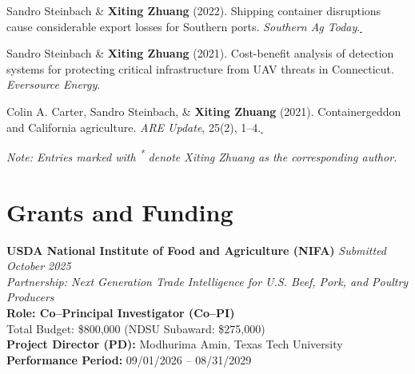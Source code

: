 \documentclass[10.5pt,letterpaper]{article}
\newcommand{\paperlink}[1]{\href{#1}{\,\small\faExternalLink}}
\renewenvironment{itemize}{
	\begin{list}{}{
			\setlength{\leftmargin}{1.5em}
		}
	}{
	\end{list}
}
\begin{document}
\begin{itemize}
		\item[-] Sandro Steinbach \& \textbf{Xiting Zhuang} (2022). Shipping container disruptions cause considerable export losses for Southern ports. \textit{Southern Ag Today}.\paperlink{https://southernagtoday.org/2022/04/shipping-container-disruptions-cause-considerable-export-losses-for-southern-ports/}
		
		\item[-] Sandro Steinbach \& \textbf{Xiting Zhuang} (2021). Cost-benefit analysis of detection systems for protecting critical infrastructure from UAV threats in Connecticut. \textit{Eversource Energy}.
		\item[-] Colin A. Carter, Sandro Steinbach, \& \textbf{Xiting Zhuang} (2021). Containergeddon and California agriculture. \textit{ARE Update}, 25(2), 1--4.\paperlink{https://giannini.ucop.edu/publications/are-update/issues/2021/25/2/containergeddon-and-california-agriculture/}
	\end{itemize}
	
	
	\begin{footnotesize}
		\textit{Note: Entries marked with \textsuperscript{*} denote Xiting Zhuang as the corresponding author.}
	\end{footnotesize}
	
	
	\section*{\textbf{Grants and Funding}}
	
	\begin{itemize}
		\item[-] \textbf{USDA National Institute of Food and Agriculture (NIFA)} \hfill \textit{Submitted October 2025} \\
		\textit{Partnership: Next Generation Trade Intelligence for U.S. Beef, Pork, and Poultry Producers} \\
		\textbf{Role: Co–Principal Investigator (Co–PI)} \\
		Total Budget: \$800,000 \hfill (NDSU Subaward: \$275,000) \\
		\textbf{Project Director (PD):} Modhurima Amin, Texas Tech University \\
		\textbf{Performance Period:} 09/01/2026 – 08/31/2029 \\
	\end{itemize}
	
	
\end{document}
